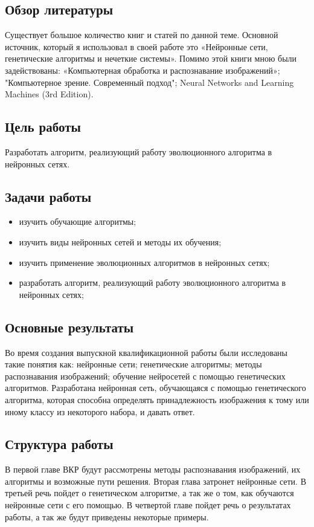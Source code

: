 \subsection*{Обзор литературы}
Существует большое количество книг и статей по данной теме. Основной источник, который я использовал в своей работе это «Нейронные сети, генетические алгоритмы и нечеткие системы». Помимо этой книги мною были задействованы: «Компьютерная обработка и распознавание изображений»; "Компьютерное зрение. Современный подход"; Neural Networks and Learning Machines (3rd Edition). 

\subsection*{Цель работы}
Разработать алгоритм, реализующий работу эволюционного алгоритма в нейронных сетях.

\subsection*{Задачи работы}
\begin{itemize}
	\item изучить обучающие алгоритмы;
	\item изучить виды нейронных сетей и методы их обучения;
	\item изучить применение эволюционных алгоритмов в нейронных сетях;
	\item разработать алгоритм, реализующий работу эволюционного 
  алгоритма в нейронных сетях;
\end{itemize}


\subsection*{Основные результаты}
Во время создания выпускной квалификационной работы были исследованы такие понятия как:
нейронные сети;
генетические алгоритмы;
методы распознавания изображений;
обучение нейросетей с помощью генетических алгоритмов.
Разработана нейронная сеть, обучающаяся с помощью генетического алгоритма, которая способна определять принадлежность изображения к тому или иному классу из некоторого набора, и давать ответ.

\subsection*{Структура работы}
В первой главе ВКР будут рассмотрены методы распознавания изображений, их алгоритмы и возможные пути решения. Вторая глава затронет нейронные сети. В третьей речь пойдет о генетическом алгоритме, а так же о том, как обучаются нейронные сети с его помощью. В четвертой главе пойдет речь о результатах работы, а так же будут приведены некоторые примеры.
